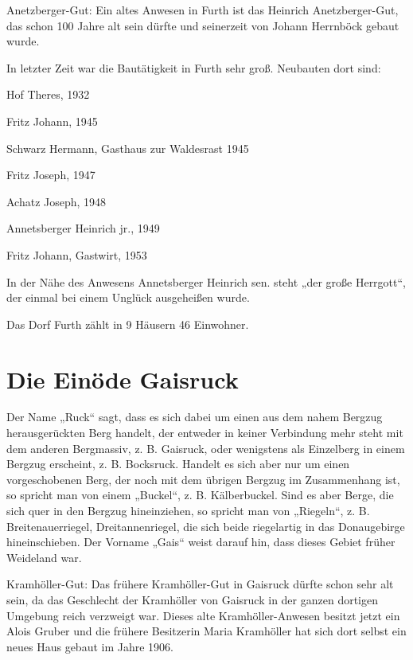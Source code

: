 \documentclass[12pt,a4pager]{book}
\begin{document}
Anetzberger-Gut: Ein altes Anwesen in Furth ist das Heinrich Anetzberger-Gut,
das schon 100 Jahre alt sein dürfte und seinerzeit von Johann Herrnböck gebaut
wurde.

In letzter Zeit war die Bautätigkeit in Furth sehr groß. Neubauten dort sind:

\begin{compactitem}
\item Hof Theres, 1932
\item Fritz Johann, 1945
\item Schwarz Hermann, Gasthaus zur Waldesrast 1945
\item Fritz Joseph, 1947
\item Achatz Joseph, 1948
\item Annetsberger Heinrich jr., 1949
\item Fritz Johann, Gastwirt, 1953
\end{compactitem}

In der Nähe des Anwesens Annetsberger Heinrich sen. steht „der große Herrgott“,
der einmal bei einem Unglück ausgeheißen wurde.

Das Dorf Furth zählt in 9 Häusern 46 Einwohner.

\section{Die Einöde Gaisruck}

Der Name „Ruck“ sagt, dass es sich dabei um einen aus dem nahem Bergzug
herausgerückten Berg handelt, der entweder in keiner Verbindung mehr steht mit
dem anderen Bergmassiv, z. B. Gaisruck, oder wenigstens als Einzelberg in einem
Bergzug erscheint, z. B. Bocksruck. Handelt es sich aber nur um einen
vorgeschobenen Berg, der noch mit dem übrigen Bergzug im Zusammenhang ist, so
spricht man von einem „Buckel“, z. B. Kälberbuckel. Sind es aber Berge, die sich
quer in den Bergzug hineinziehen, so spricht man von „Riegeln“, z. B.
Breitenauerriegel, Dreitannenriegel, die sich beide riegelartig in das
Donaugebirge hineinschieben. Der Vorname „Gais“ weist darauf hin, dass dieses
Gebiet früher Weideland war.

Kramhöller-Gut: Das frühere Kramhöller-Gut in Gaisruck dürfte schon sehr alt
sein, da das Geschlecht der Kramhöller von Gaisruck in der ganzen dortigen
Umgebung reich verzweigt war. Dieses alte Kramhöller-Anwesen besitzt jetzt ein
Alois Gruber und die frühere Besitzerin Maria Kramhöller hat sich dort selbst
ein neues Haus gebaut im Jahre 1906.
\end{document}
